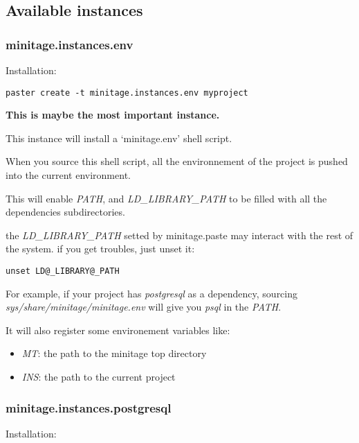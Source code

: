 \documentclass[letterpaper,10pt,english]{sphinxmanual}
\begin{document}
\subsection{Available instances}
\label{paster/instances/index:available-instances}

\subsubsection{minitage.instances.env}
\label{paster/instances/instances:minitage-instances-env}\label{paster/instances/instances::doc}
Installation:

\begin{Verbatim}[commandchars=@\[\]]
paster create -t minitage.instances.env myproject
\end{Verbatim}

\textbf{This is maybe the most important instance.}

This instance will install a `minitage.env' shell script.

When you source this shell script, all the environnement of the project is pushed into the current environment.

This will enable \emph{PATH}, and  \emph{LD\_LIBRARY\_PATH} to be filled with all the dependencies subdirectories.

the \emph{LD\_LIBRARY\_PATH} setted by minitage.paste may interact with the rest of the system. if you get troubles, just unset it:

\begin{Verbatim}[commandchars=@\[\]]
unset LD@_LIBRARY@_PATH
\end{Verbatim}

For example, if your project has \emph{postgresql} as a dependency, sourcing \emph{sys/share/minitage/minitage.env} will give you \emph{psql} in the \emph{PATH}.

It will also register some environement variables like:
\begin{itemize}
\item {} 
\emph{MT}: the path to the minitage top directory

\item {} 
\emph{INS}: the path to the current project

\end{itemize}


\subsubsection{minitage.instances.postgresql}
\label{paster/instances/instances:minitage-instances-postgresql}
Installation:
\end{document}

